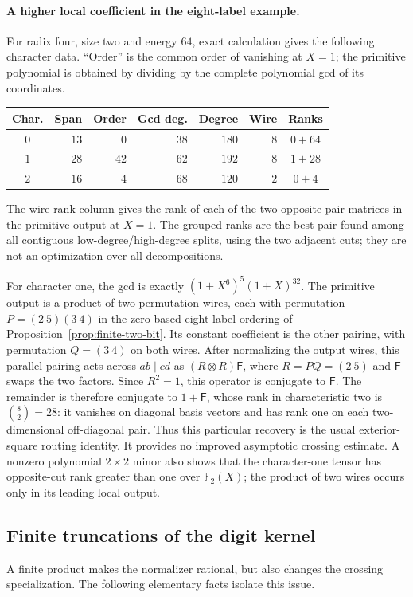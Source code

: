 \paragraph{A higher local coefficient in the eight-label example.}
For radix four, size two and energy $64$, exact calculation gives the following character data. ``Order'' is the common order of vanishing at $X=1$; the primitive polynomial is obtained by dividing by the complete polynomial gcd of its coordinates.
\begin{center}
\begin{tabular}{@{}crrrrrc@{}}
\toprule
Char. & Span & Order & Gcd deg. & Degree & Wire & Ranks\\
\midrule
$0$&$13$&$0$&$38$&$180$&$8$&$0+64$\\
$1$&$28$&$42$&$62$&$192$&$8$&$1+28$\\
$2$&$16$&$4$&$68$&$120$&$2$&$0+4$\\
\bottomrule
\end{tabular}
\end{center}
The wire-rank column gives the rank of each of the two opposite-pair matrices in the primitive output at $X=1$. The grouped ranks are the best pair found among all contiguous low-degree/high-degree splits, using the two adjacent cuts; they are not an optimization over all decompositions.

For character one, the gcd is exactly
$(1+X^6)^5(1+X)^{32}$.
The primitive output is a product of two permutation wires, each with permutation $P=(2\ 5)(3\ 4)$ in the zero-based eight-label ordering of Proposition~\ref{prop:finite-two-bit}. Its constant coefficient is the other pairing, with permutation $Q=(3\ 4)$ on both wires. After normalizing the output wires, this parallel pairing acts across $ab\mid cd$ as
$(R\otimes R)\mathsf F$, where $R=PQ=(2\ 5)$ and $\mathsf F$ swaps the two factors. Since $R^2=1$, this operator is conjugate to $\mathsf F$. The remainder is therefore conjugate to $1+\mathsf F$, whose rank in characteristic two is $\binom82=28$: it vanishes on diagonal basis vectors and has rank one on each two-dimensional off-diagonal pair. Thus this particular recovery is the usual exterior-square routing identity. It provides no improved asymptotic crossing estimate. A nonzero polynomial $2\times2$ minor also shows that the character-one tensor has opposite-cut rank greater than one over $\mathbb F_2(X)$; the product of two wires occurs only in its leading local output.

\subsection{Finite truncations of the digit kernel}
A finite product makes the normalizer rational, but also changes the crossing specialization. The following elementary facts isolate this issue.

